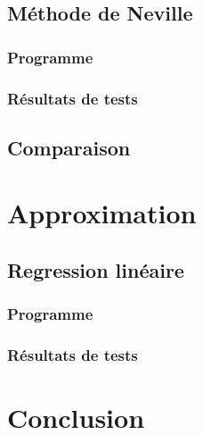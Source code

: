 \documentclass{report}
\begin{document}
	\section{Méthode de Neville}
		\subsection{Programme}
        
		\subsection{Résultats de tests}
			\renewcommand{\arraystretch}{2}
			\renewcommand{\arraystretch}{1}
	\section{Comparaison}
  \chapter{Approximation}
	\section{Regression linéaire}
		\subsection{Programme}
        
		\subsection{Résultats de tests}
			\renewcommand{\arraystretch}{2}
			\renewcommand{\arraystretch}{1}
	\chapter{Conclusion}
\end{document}
